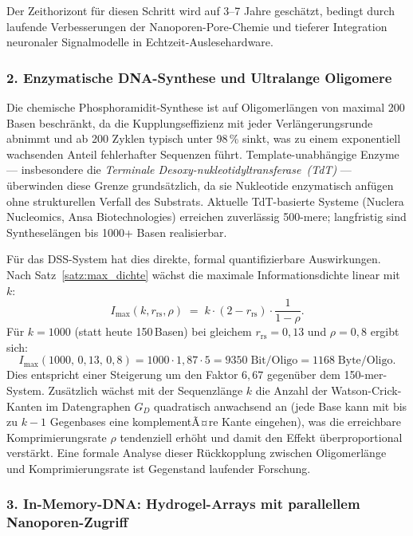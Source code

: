 ﻿\documentclass[a4paper,12pt]{article}
\theoremstyle{definition}
\begin{document}
Der Zeithorizont f\"{u}r diesen Schritt wird auf 3--7 Jahre gesch\"{a}tzt,
bedingt durch laufende Verbesserungen der Nanoporen-Pore-Chemie und
tieferer Integration neuronaler Signalmodelle in Echtzeit-Auslesehardware.

\subsubsection*{2.\; Enzymatische DNA-Synthese und Ultralange Oligomere}

Die chemische Phosphoramidit-Synthese ist auf Oligomerl\"{a}ngen von maximal
200\,Basen beschr\"{a}nkt, da die Kupplungseffizienz mit jeder Verl\"{a}ngerungsrunde
abnimmt und ab 200 Zyklen typisch unter 98\,\% sinkt, was zu einem
exponentiell wachsenden Anteil fehlerhafter Sequenzen f\"{u}hrt.
Template-unabh\"{a}ngige Enzyme --- insbesondere die
\emph{Terminale Desoxy-nukleotidyltransferase~(TdT)} --- \"{u}berwinden
diese Grenze grunds\"{a}tzlich, da sie Nukleotide enzymatisch anf\"{u}gen
ohne strukturellen Verfall des Substrats.
Aktuelle TdT-basierte Systeme (Nuclera Nucleomics, Ansa Biotechnologies)
erreichen zuverl\"{a}ssig 500-mere; langfristig sind Synthesel\"{a}ngen
bis 1000+ Basen realisierbar.

F\"{u}r das DSS-System hat dies direkte, formal quantifizierbare Auswirkungen.
Nach Satz~\ref{satz:max_dichte} w\"{a}chst die maximale Informationsdichte
linear mit~$k$:
\[
    I_{\max}(k, r_{\mathrm{rs}}, \rho) \;=\;
    k \cdot (2 - r_{\mathrm{rs}}) \cdot \frac{1}{1-\rho}.
\]
F\"{u}r $k = 1000$ (statt heute 150\,Basen) bei gleichem
$r_{\mathrm{rs}} = 0{,}13$ und $\rho = 0{,}8$ ergibt sich:
\[
    I_{\max}(1000,\, 0{,}13,\, 0{,}8) = 1000 \cdot 1{,}87 \cdot 5
    = 9350 \;\text{Bit/Oligo} = 1168 \;\text{Byte/Oligo}.
\]
Dies entspricht einer Steigerung um den Faktor $6{,}67$ gegen\"{u}ber dem
150-mer-System.
Zus\"{a}tzlich w\"{a}chst mit der Sequenzl\"{a}nge $k$ die Anzahl der
Watson-Crick-Kanten im Datengraphen $G_D$ quadratisch anwachsend an
(jede Base kann mit bis zu $k-1$ Gegenbases eine komplementÃ¤re
Kante eingehen), was die erreichbare Komprimierungsrate $\rho$ tendenziell
erh\"{o}ht und damit den Effekt \"{u}berproportional verst\"{a}rkt.
Eine formale Analyse dieser R\"{u}ckkopplung zwischen Oligomerl\"{a}nge
und Komprimierungsrate ist Gegenstand laufender Forschung.

\subsubsection*{3.\; In-Memory-DNA: Hydrogel-Arrays mit parallellem Nanoporen-Zugriff}
\end{document}
